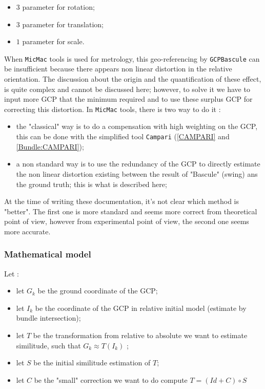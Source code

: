 \begin{itemize}
   \item $3$ parameter for rotation;
   \item $3$ parameter for translation;
   \item $1$ parameter for scale.
\end{itemize}


When {\tt MicMac} tools is used for metrology, this geo-referencing by {\tt GCPBascule}
can be insufficient because there appears non linear distortion in the relative orientation. The discussion about the
origin and the quantification of these effect,  is quite complex and cannot be discussed here;
however,  to solve it we have to input more GCP that the minimum required and to use these
surplus GCP for correcting this distortion. In {\tt MicMac} tools, there is two way to do it :


\begin{itemize}
   \item the "classical" way is to do a compensation with high weighting on the GCP, this can be done
        with the simplified tool   {\tt Campari}  (\ref{CAMPARI} and \ref{Bundle:CAMPARI});

   \item a non standard way is to use the redundancy of the GCP to directly estimate the non linear distortion
        existing between the result of "Bascule" (swing) ans the ground truth; this is what is described here;

\end{itemize}

At the time of writing these documentation, it's not clear which method is "better". The first one is more
standard and seems more correct from theoretical point of view, however from experimental point of view, the
second one seems more accurate.


\subsubsection{Mathematical model}

Let :

\begin{itemize}
   \item let $G_k$ be the ground coordinate of the GCP;
   \item let $I_k$ be the coordinate of the GCP in relative initial model (estimate by bundle intersection);
   \item let $T$ be the transformation from relative to absolute we want to estimate similitude, such that  $G_k \approx T(I_k)$ ;
   \item let $S$ be the initial similitude estimation of $T$;
   \item let $C$ be the "small" correction we want to do compute $T= (Id+C) \circ S$
\end{itemize}


